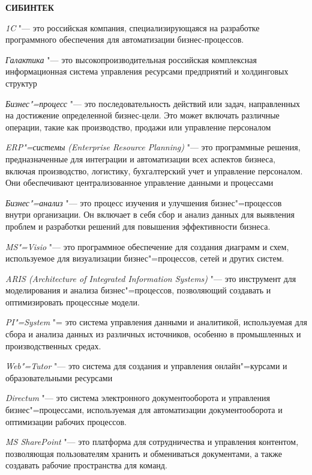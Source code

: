 \documentclass{article}
\begin{document}
\begin{center}
    \textbf{СИБИНТЕК}
\end{center}

\textit{1C} "--- это российская компания, специализирующаяся на разработке программного обеспечения для автоматизации бизнес-процессов.

\textit{Галактика} "--- это высокопроизводительная российская комплексная информационная система управления ресурсами предприятий и холдинговых структур

\textit{Бизнес"=процесс} "--- это последовательность действий или задач, направленных на достижение определенной бизнес-цели. Это может включать различные операции, такие как производство, продажи или управление персоналом

\textit{ERP"=системы (Enterprise Resource Planning)} "--- это программные решения, предназначенные для интеграции и автоматизации всех аспектов бизнеса, включая производство, логистику, бухгалтерский учет и управление персоналом. Они обеспечивают централизованное управление данными и процессами

\textit{Бизнес"=анализ} "--- это процесс изучения и улучшения бизнес"=процессов внутри организации. Он включает в себя сбор и анализ данных для выявления проблем и разработки решений для повышения эффективности бизнеса.

\textit{MS"=Visio} "--- это программное обеспечение для создания диаграмм и схем, используемое для визуализации бизнес"=процессов, сетей и других систем.

\textit{ARIS (Architecture of Integrated Information Systems)} "--- это инструмент для моделирования и анализа бизнес"=процессов, позволяющий создавать и оптимизировать процессные модели.

\textit{PI"=System} "= это система управления данными и аналитикой, используемая для сбора и анализа данных из различных источников, особенно в промышленных и производственных средах.

\textit{Web"=Tutor} "--- это система для создания и управления онлайн"=курсами и образовательными ресурсами

\textit{Directum} "--- это система электронного документооборота и управления бизнес"=процессами, используемая для автоматизации документооборота и оптимизации рабочих процессов.

\textit{MS SharePoint} "--- это платформа для сотрудничества и управления контентом, позволяющая пользователям хранить и обмениваться документами, а также создавать рабочие пространства для команд.
\end{document}

